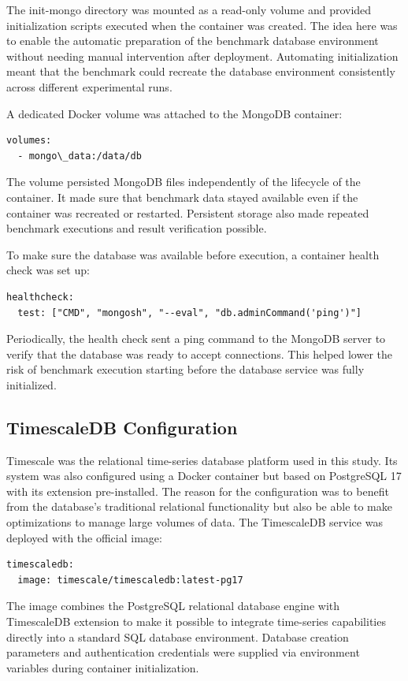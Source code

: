The init-mongo directory was mounted as a read-only volume and provided initialization scripts executed when the container was created. The idea here was to enable the automatic preparation of the benchmark database environment without needing manual intervention after deployment. Automating initialization meant that the benchmark could recreate the database environment consistently across different experimental runs. 

A dedicated Docker volume was attached to the MongoDB container:

\begin{verbatim}
volumes:
  - mongo\_data:/data/db
\end{verbatim}

The volume persisted MongoDB files independently of the lifecycle of the container. It made sure that benchmark data stayed available even if the container was recreated or restarted. Persistent storage also made repeated benchmark executions and result verification possible.

To make sure the database was available before execution, a container health check was set up:

\begin{verbatim}
healthcheck:
  test: ["CMD", "mongosh", "--eval", "db.adminCommand('ping')"]
\end{verbatim}

Periodically, the health check sent a ping command to the MongoDB server to verify that the database was ready to accept connections. This helped lower the risk of benchmark execution starting before the database service was fully initialized. 

\subsection{TimescaleDB Configuration}
Timescale was the relational time-series database platform used in this study. Its system was also configured using a Docker container but based on PostgreSQL 17 with its extension pre-installed. The reason for the configuration was to benefit from the database’s traditional relational functionality but also be able to make optimizations to manage large volumes of data. The TimescaleDB service was deployed with the official image:
\begin{verbatim}
timescaledb:
  image: timescale/timescaledb:latest-pg17
\end{verbatim}

The image combines the PostgreSQL relational database engine with TimescaleDB extension to make it possible to integrate time-series capabilities directly into a standard SQL database environment. Database creation parameters and authentication credentials were supplied via environment variables during container initialization.

